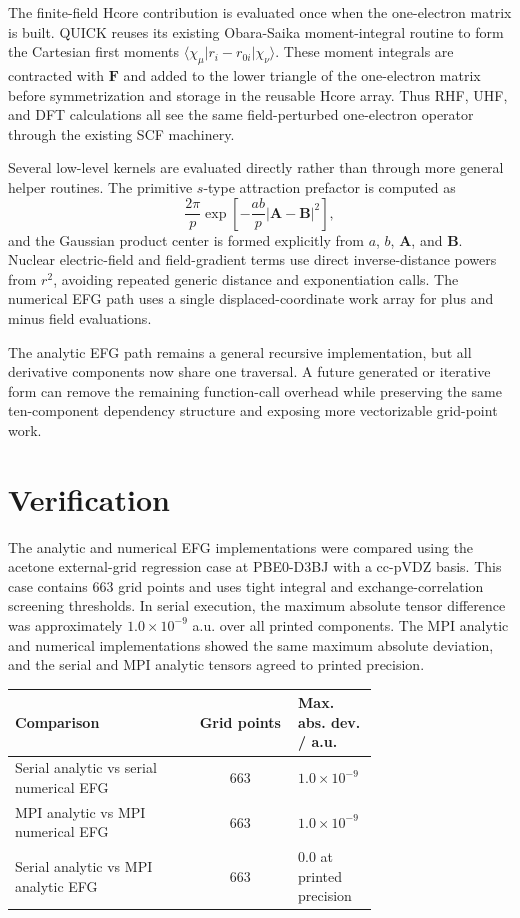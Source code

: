 \documentclass[journal=jcisd8,manuscript=article]{achemso}
\begin{document}
The finite-field Hcore contribution is evaluated once when the one-electron matrix is built.  QUICK reuses its existing Obara-Saika moment-integral routine to form the Cartesian first moments \(\langle \chi_\mu | r_i-r_{0i}|\chi_\nu\rangle\).  These moment integrals are contracted with \(\mathbf{F}\) and added to the lower triangle of the one-electron matrix before symmetrization and storage in the reusable Hcore array.  Thus RHF, UHF, and DFT calculations all see the same field-perturbed one-electron operator through the existing SCF machinery.

Several low-level kernels are evaluated directly rather than through more general helper routines.  The primitive \(s\)-type attraction prefactor is computed as
\begin{equation}
  \frac{2\pi}{p}
  \exp\left[-\frac{ab}{p}|\mathbf{A}-\mathbf{B}|^2\right],
\end{equation}
and the Gaussian product center is formed explicitly from \(a\), \(b\), \(\mathbf{A}\), and \(\mathbf{B}\).  Nuclear electric-field and field-gradient terms use direct inverse-distance powers from \(r^2\), avoiding repeated generic distance and exponentiation calls.  The numerical EFG path uses a single displaced-coordinate work array for plus and minus field evaluations.

The analytic EFG path remains a general recursive implementation, but all derivative components now share one traversal.  A future generated or iterative form can remove the remaining function-call overhead while preserving the same ten-component dependency structure and exposing more vectorizable grid-point work.

\section{Verification}

The analytic and numerical EFG implementations were compared using the acetone external-grid regression case at PBE0-D3BJ with a cc-pVDZ basis.  This case contains 663 grid points and uses tight integral and exchange-correlation screening thresholds.  In serial execution, the maximum absolute tensor difference was approximately \(1.0\times10^{-9}\) a.u. over all printed components.  The MPI analytic and numerical implementations showed the same maximum absolute deviation, and the serial and MPI analytic tensors agreed to printed precision.

\begin{center}
\small
\begin{tabular}{p{0.50\linewidth}cp{0.22\linewidth}}
\toprule
Comparison & Grid points & Max. abs. dev. / a.u. \\
\midrule
Serial analytic vs serial numerical EFG & 663 & \(1.0\times10^{-9}\) \\
MPI analytic vs MPI numerical EFG & 663 & \(1.0\times10^{-9}\) \\
Serial analytic vs MPI analytic EFG & 663 & \(0.0\) at printed precision \\
\bottomrule
\end{tabular}
\end{center}
\end{document}
